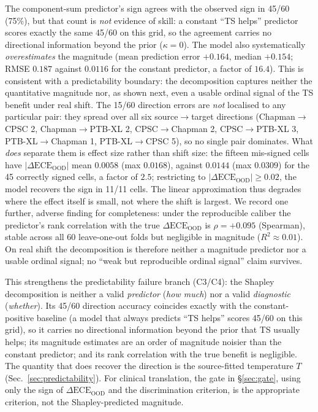 \documentclass[review,12pt,nonatbib]{elsarticle}
\begin{document}
The component-sum predictor's sign agrees with the observed sign in
45/60 (75\%), but that count is \emph{not} evidence of skill: a
constant ``TS helps'' predictor scores exactly the same 45/60 on this
grid, so the agreement carries no directional information beyond the
prior ($\kappa = 0$). The model also systematically \emph{overestimates}
the magnitude (mean prediction error $+0.164$, median $+0.154$; RMSE
$0.187$ against $0.0116$ for the constant predictor, a factor of
$16.4$). This is consistent with a predictability boundary: the
decomposition captures neither the quantitative magnitude nor, as
shown next, even a usable ordinal signal of the TS benefit under real
shift. The 15/60 direction errors are \emph{not} localised to any
particular pair: they spread over all six source$\rightarrow$target
directions (Chapman$\rightarrow$CPSC 2, Chapman$\rightarrow$PTB-XL 2,
CPSC$\rightarrow$Chapman 2, CPSC$\rightarrow$PTB-XL 3,
PTB-XL$\rightarrow$Chapman 1, PTB-XL$\rightarrow$CPSC 5), so no single
pair dominates. What \emph{does} separate them is effect size rather than
shift size: the fifteen mis-signed cells have
$|\Delta\text{ECE}_{\text{OOD}}|$ mean $0.0058$ (max $0.0168$), against
$0.0144$ (max $0.0309$) for the 45 correctly signed cells, a factor of
$2.5$; restricting to $|\Delta\text{ECE}_{\text{OOD}}| \geq 0.02$, the
model recovers the sign in 11/11 cells. The linear approximation thus
degrades where the effect itself is small, not where the shift is
largest. We record one further, adverse finding for completeness: under
the reproducible caliber the predictor's rank correlation with the true
$\Delta\text{ECE}_{\text{OOD}}$ is $\rho = +0.095$ (Spearman), stable
across all 60 leave-one-out folds but negligible in magnitude
($R^2 \approx 0.01$). On real shift the decomposition is therefore
neither a magnitude predictor nor a usable ordinal signal; no ``weak but
reproducible ordinal signal'' claim survives.

This strengthens the predictability failure branch (C3/C4): the
Shapley decomposition is neither a valid \emph{predictor} (\emph{how
much}) nor a valid \emph{diagnostic} (\emph{whether}). Its 45/60
direction accuracy coincides exactly with the constant-positive
baseline (a model that always predicts ``TS helps'' scores 45/60 on
this grid), so it carries no directional information beyond the prior
that TS usually helps; its magnitude estimates are an order of
magnitude noisier than the constant predictor; and its rank
correlation with the true benefit is negligible. The quantity
that does recover the direction is the source-fitted temperature $T$
(Sec.~\ref{sec:predictability}). For clinical translation, the gate in
\S\ref{sec:gate}, using only the sign of
$\Delta\text{ECE}_{\text{OOD}}$ and the discrimination criterion, is the
appropriate criterion, not the Shapley-predicted magnitude.
\end{document}

